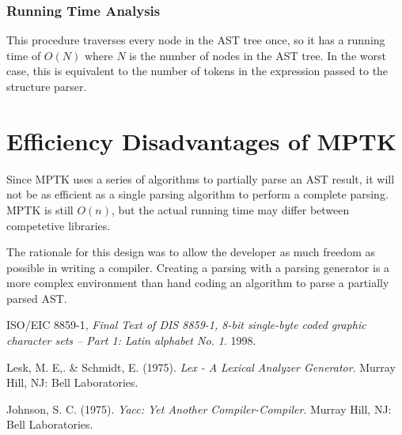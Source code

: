 \documentclass[10pt,a4paper]{article}
\begin{document}
\subsubsection{Running Time Analysis}
This procedure traverses every node in the AST tree once, so it has a running time of $O(N)$ where $N$ is the number of nodes in the AST tree. In the worst case, this is equivalent to the number of tokens in the expression passed to the structure parser.

\section{Efficiency Disadvantages of MPTK}
Since MPTK uses a series of algorithms to partially parse an AST result, it will not be as efficient as a single parsing algorithm to perform a complete parsing. MPTK is still $O(n)$, but the actual running time may differ between competetive libraries.

The rationale for this design was to allow the developer as much freedom as possible in writing a compiler. Creating a parsing with a parsing generator is a more complex environment than hand coding an algorithm to parse a partially parsed AST.

\begin{thebibliography}{9}
	ISO/EIC 8859-1,
	\emph{Final Text of DIS 8859-1, 8-bit single-byte coded graphic character sets -- Part 1: Latin alphabet No. 1}.
	1998.

	Lesk, M. E,. \& Schmidt, E. (1975). \emph{Lex - A Lexical Analyzer Generator}. Murray Hill, NJ: Bell Laboratories.

	Johnson, S. C. (1975). \emph{Yacc: Yet Another Compiler-Compiler}. Murray Hill, NJ: Bell Laboratories.
\end{thebibliography}


\end{document}
